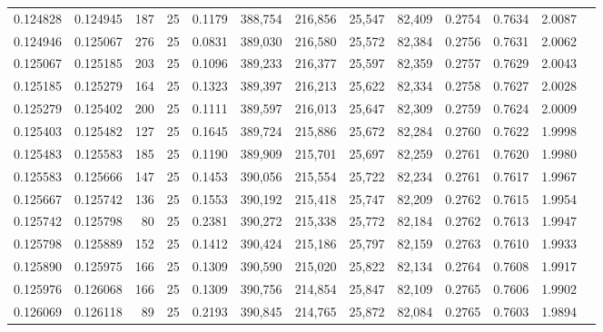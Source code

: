 \begin{tabular}{rrrrrrrrrrrrr}
0.124828 & 0.124945 &   187 &  25 &                                     0.1179 & 388,754 & 216,856 &  25,547 &  82,409 & 0.2754 & 0.7634 & 2.0087 \\
0.124946 & 0.125067 &   276 &  25 &                                     0.0831 & 389,030 & 216,580 &  25,572 &  82,384 & 0.2756 & 0.7631 & 2.0062 \\
0.125067 & 0.125185 &   203 &  25 &                                     0.1096 & 389,233 & 216,377 &  25,597 &  82,359 & 0.2757 & 0.7629 & 2.0043 \\
0.125185 & 0.125279 &   164 &  25 &                                     0.1323 & 389,397 & 216,213 &  25,622 &  82,334 & 0.2758 & 0.7627 & 2.0028 \\
0.125279 & 0.125402 &   200 &  25 &                                     0.1111 & 389,597 & 216,013 &  25,647 &  82,309 & 0.2759 & 0.7624 & 2.0009 \\
0.125403 & 0.125482 &   127 &  25 &                                     0.1645 & 389,724 & 215,886 &  25,672 &  82,284 & 0.2760 & 0.7622 & 1.9998 \\
0.125483 & 0.125583 &   185 &  25 &                                     0.1190 & 389,909 & 215,701 &  25,697 &  82,259 & 0.2761 & 0.7620 & 1.9980 \\
0.125583 & 0.125666 &   147 &  25 &                                     0.1453 & 390,056 & 215,554 &  25,722 &  82,234 & 0.2761 & 0.7617 & 1.9967 \\
0.125667 & 0.125742 &   136 &  25 &                                     0.1553 & 390,192 & 215,418 &  25,747 &  82,209 & 0.2762 & 0.7615 & 1.9954 \\
0.125742 & 0.125798 &    80 &  25 &                                     0.2381 & 390,272 & 215,338 &  25,772 &  82,184 & 0.2762 & 0.7613 & 1.9947 \\
0.125798 & 0.125889 &   152 &  25 &                                     0.1412 & 390,424 & 215,186 &  25,797 &  82,159 & 0.2763 & 0.7610 & 1.9933 \\
0.125890 & 0.125975 &   166 &  25 &                                     0.1309 & 390,590 & 215,020 &  25,822 &  82,134 & 0.2764 & 0.7608 & 1.9917 \\
0.125976 & 0.126068 &   166 &  25 &                                     0.1309 & 390,756 & 214,854 &  25,847 &  82,109 & 0.2765 & 0.7606 & 1.9902 \\
0.126069 & 0.126118 &    89 &  25 &                                     0.2193 & 390,845 & 214,765 &  25,872 &  82,084 & 0.2765 & 0.7603 & 1.9894 \\

\end{tabular}

